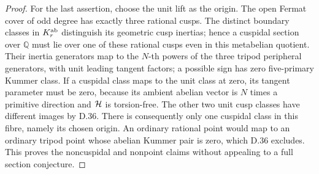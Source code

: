\begin{proof}
For the last assertion, choose the
unit lift as the origin. The open
Fermat cover of odd degree has
exactly three rational cusps.
The distinct boundary classes in
\(K_r^{\rm ab}\) distinguish its
geometric cusp inertias; hence
a cuspidal section over \(\mathbb Q\)
must lie over one of these rational
cusps even in this metabelian quotient.
Their inertia generators map to
the \(N\)-th powers of the three
tripod peripheral generators,
with unit leading tangent factors;
a possible sign has zero
five-primary Kummer class.
If a cuspidal class maps to the
unit class at zero, its tangent
parameter must be zero, because
its ambient abelian vector is
\(N\) times a primitive direction
and \({\cal H}\) is torsion-free.
The other two unit cusp classes
have different images by D.36.
There is consequently only one
cuspidal class in this fibre,
namely its chosen origin.
An ordinary rational point would
map to an ordinary tripod point
whose abelian Kummer pair is zero,
which D.36 excludes. This proves
the noncuspidal and nonpoint
claims without appealing to a
full section conjecture.
\end{proof}

